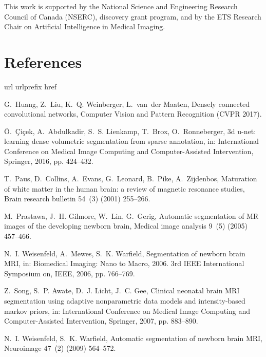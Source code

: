 \documentclass[twoside,espcrc2]{elsarticle}
\begin{document}
This work is supported by the National Science and Engineering Research Council of Canada (NSERC), discovery grant program, and by the ETS Research Chair on Artificial Intelligence in Medical Imaging.

\section*{References}

%

\begin{thebibliography}{10}
\expandafter\ifx\csname url\endcsname\relax
  \def\url#1{\texttt{#1}}\fi
\expandafter\ifx\csname urlprefix\endcsname\relax\def\urlprefix{URL }\fi
\expandafter\ifx\csname href\endcsname\relax
  \def\href#1#2{#2} \def\path#1{#1}\fi

G.~Huang, Z.~Liu, K.~Q. Weinberger, L.~van~der Maaten, Densely connected
  convolutional networks, Computer Vision and Pattern Recognition (CVPR 2017).

{\"O}.~{\c{C}}i{\c{c}}ek, A.~Abdulkadir, S.~S. Lienkamp, T.~Brox,
  O.~Ronneberger, 3d u-net: learning dense volumetric segmentation from sparse
  annotation, in: International Conference on Medical Image Computing and
  Computer-Assisted Intervention, Springer, 2016, pp. 424--432.

T.~Paus, D.~Collins, A.~Evans, G.~Leonard, B.~Pike, A.~Zijdenbos, Maturation of
  white matter in the human brain: a review of magnetic resonance studies,
  Brain research bulletin 54~(3) (2001) 255--266.

M.~Prastawa, J.~H. Gilmore, W.~Lin, G.~Gerig, Automatic segmentation of {MR}
  images of the developing newborn brain, Medical image analysis 9~(5) (2005)
  457--466.

N.~I. Weisenfeld, A.~Mewes, S.~K. Warfield, Segmentation of newborn brain
  {MRI}, in: Biomedical Imaging: Nano to Macro, 2006. 3rd IEEE International
  Symposium on, IEEE, 2006, pp. 766--769.

Z.~Song, S.~P. Awate, D.~J. Licht, J.~C. Gee, Clinical neonatal brain {MRI}
  segmentation using adaptive nonparametric data models and intensity-based
  markov priors, in: International Conference on Medical Image Computing and
  Computer-Assisted Intervention, Springer, 2007, pp. 883--890.

N.~I. Weisenfeld, S.~K. Warfield, Automatic segmentation of newborn brain
  {MRI}, Neuroimage 47~(2) (2009) 564--572.


\end{thebibliography}
\end{document}
